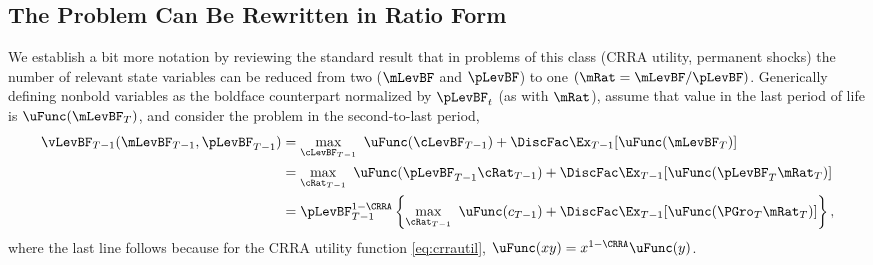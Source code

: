 \documentclass[BufferStockTheory]{subfiles}
\begin{document}
\hypertarget{The-Problem-Can-Be-Rewritten-in-Ratio-Form}{}
\subsection{The Problem Can Be Rewritten in Ratio Form}

\label{subsec:ratio}

We establish a bit more notation by reviewing the standard result that in problems of this class (CRRA utility, permanent shocks) the number of relevant state variables can be reduced from two ($\mLevBF$ and $\pLevBF$) to one $(\mRat = \mLevBF/\pLevBF)$.  Generically defining nonbold variables as the boldface counterpart normalized by $\pLevBF_{t}$ (as with $\mRat$), assume that value in the last period of life is $\uFunc(\mLevBF_{T})$, and consider the problem in the second-to-last period,
\begin{align}
  \vLevBF_{T-1}(\mLevBF_{T-1},\pLevBF_{T-1})  & = 
                                                \max_{\cLevBF_{T-1}}~ \uFunc(\cLevBF_{T-1}) +\DiscFac \Ex_{T-1} [ \uFunc(\mLevBF_{T})]
                                                \notag \\
                                              & =  \max_{\cRat_{T-1}}~
                                                \uFunc(\pLevBF_{T-1}\cRat_{T-1}) + \DiscFac  \Ex_{T-1} [\uFunc(\pLevBF_{T}{\mRat}
                                                _{T})]  \notag \\
                                              & = \pLevBF_{T-1}^{1-\CRRA}
                                                \left\{\max_{\cRat_{T-1}}~ \uFunc(c_{T-1}) + \DiscFac \Ex_{T-1} [ \uFunc( {\PGro}_{T}
                                                {\mRat}_{T}) ] \right\},   \label{eq:vBold}
\end{align}
where the last line follows because for the CRRA utility function \eqref{eq:crrautil}, $\uFunc(xy) =
x^{1-\CRRA}\uFunc(y)$.
\end{document}
